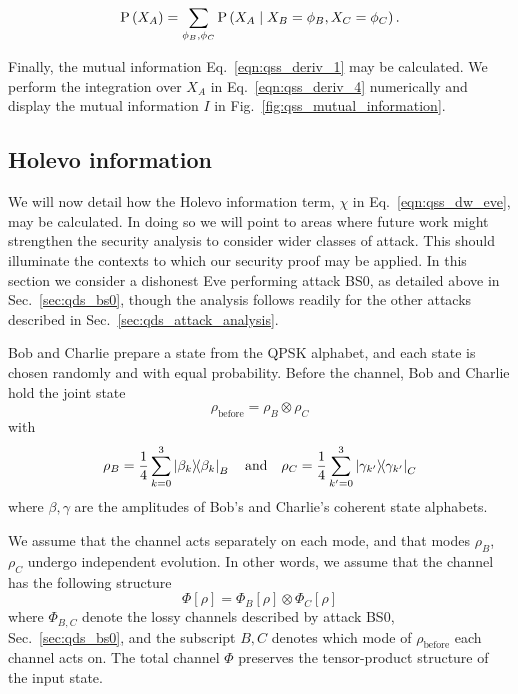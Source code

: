 \begin{equation}\label{eqn:qss_deriv_pxa}
\text{P}\left(X_A\right) = \sum_{\phi_B, \phi_C} \text{P}\left(X_A \; \middle| \; X_B=\phi_B, X_C=\phi_C\right).
\end{equation}


Finally, the mutual information Eq.~\ref{eqn:qss_deriv_1} may be calculated. We perform the integration over $X_A$ in Eq.~\ref{eqn:qss_deriv_4} numerically and display the mutual information $I$ in Fig.~\ref{fig:qss_mutual_information}.


\subsection{Holevo information}

We will now detail how the Holevo information term, $\chi$ in Eq.~\ref{eqn:qss_dw_eve}, may be calculated. In doing so we will point to areas where future work might strengthen the security analysis to consider wider classes of attack. This should illuminate the contexts to which our security proof may be applied. In this section we consider a dishonest Eve performing attack BS$0$, as detailed above in Sec.~\ref{sec:qds_bs0}, though the analysis follows readily for the other attacks described in Sec.~\ref{sec:qds_attack_analysis}. %

Bob and Charlie prepare a state from the QPSK alphabet, and each state is chosen randomly and with equal probability. Before the channel, Bob and Charlie hold the joint state
\begin{equation}
\rho_{\text{before}} = \rho_B \otimes \rho_C
\end{equation}
with
\begin{equation}\label{eqn:qss_initial_states}
\rho_B = \frac{1}{4} \sum_{k=0}^3 \dyad{\beta_k}_B \qq{and} \rho_C = \frac{1}{4} \sum_{k^\prime = 0}^3 \dyad{\gamma_{k^\prime}}_C
\end{equation}
where $\beta, \gamma$ are the amplitudes of Bob's and Charlie's coherent state alphabets.

We assume that the channel acts separately on each mode, and that modes $\rho_B$, $\rho_C$ undergo independent evolution. In other words, we assume that the channel has the following structure
\begin{equation}\label{eqn:qss_channel}
\Phi\left[\rho\right] = \Phi_B\left[\rho\right] \otimes \Phi_C\left[\rho\right]
\end{equation}
where $\Phi_{B, C}$ denote the lossy channels described by attack BS$0$, Sec.~\ref{sec:qds_bs0}, and the subscript $B, C$ denotes which mode of $\rho_{\text{before}}$ each channel acts on. The total channel $\Phi$ preserves the tensor-product structure of the input state.


